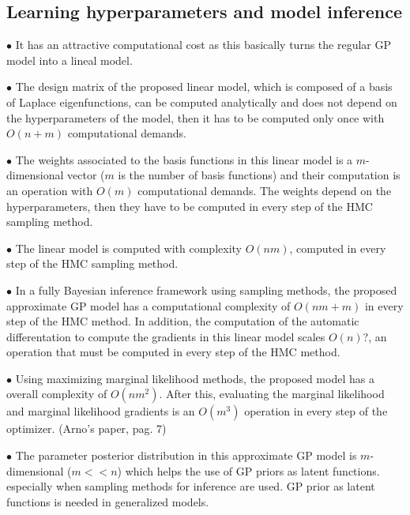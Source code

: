 \documentclass[]{interact}
\theoremstyle{plain}%
\theoremstyle{definition}
\theoremstyle{remark}
\begin{document}
\subsection{Learning hyperparameters and model inference}

\vspace{2mm}
$\bullet$ It has an attractive computational cost as this basically turns the regular GP model into a lineal model.

\vspace{2mm}
$\bullet$ The design matrix of the proposed linear model, which is composed of a basis of Laplace eigenfunctions, can be computed analytically and does not depend on the hyperparameters of the model, then it has to be computed only once with $O(n+m)$ computational demands.

\vspace{2mm}
$\bullet$ The weights associated to the basis functions in this linear model is a $m$-dimensional vector ($m$ is the number of basis functions) and their computation is an operation with $O(m)$ computational demands. The weights depend on the hyperparameters, then they have to be computed in every step of the HMC sampling method.

\vspace{2mm}
$\bullet$ The linear model is computed with complexity $O(nm)$, computed in every step of the HMC sampling method.

\vspace{2mm}
$\bullet$ In a fully Bayesian inference framework using sampling methods, the proposed approximate GP model has a computational complexity of $O(nm+m)$ in every step of the HMC method. In addition, the computation of the automatic differentation to compute the gradients in this linear model scales $O(n)$?, an operation that must be computed in every step of the HMC method.

\vspace{2mm}
$\bullet$ Using maximizing marginal likelihood methods, the proposed model has a overall complexity of $O(nm^2)$. After this, evaluating the marginal likelihood and marginal likelihood gradients is an $O(m^3)$ operation in every step of the optimizer. (Arno's paper, pag. 7)

\vspace{2mm}
$\bullet$ The parameter posterior distribution in this approximate GP model is $m$-dimensional ($m<<n$) which helps the use of GP priors as latent functions. especially when sampling methods for inference are used. GP prior as latent functions is needed in generalized models.
\end{document}
